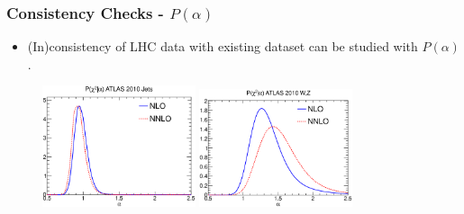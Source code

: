\documentclass[10pt]{beamer}
\begin{document}
\begin{frame}
\frametitle{Consistency Checks - $P(\alpha)$}
 \begin{itemize}
\item<1-> \small (In)consistency of LHC data with existing dataset can be studied with $P(\alpha)$.
\end{itemize}


%
%
\begin{figure}
    \begin{center}
      \includegraphics[width=0.4\textwidth]{palpha-atlasjets.eps}
      \includegraphics[width=0.4\textwidth]{palpha-atlaswz.eps}\\

\end{center}
\end{figure}
\end{frame}
\end{document}
